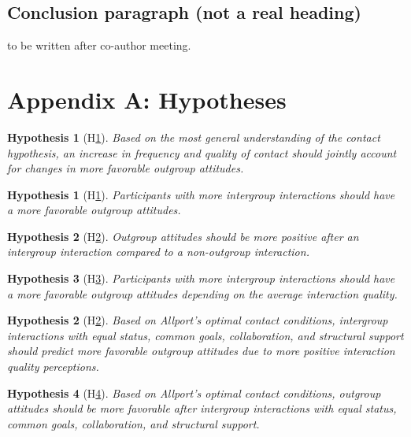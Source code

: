 \documentclass[man, 12pt, a4paper]{apa7}
\theoremstyle{break}
\theoremstyle{plain}
\newtheorem{hyp}{Hypothesis}
\newtheorem{subhyp}{Hypothesis}
\begin{document}
\subsection{Conclusion paragraph (not a real heading)}
to be written after co-author meeting.


\printbibliography

\appendix

\section{Appendix A: Hypotheses}
\label{app:AppendixHypotheses}

\begin{hyp}[H\ref{hyp:contact}] \label{hyp:contact}
Based on the most general understanding of the contact hypothesis, an increase in frequency and quality of contact should jointly account for changes in more favorable outgroup attitudes.
\end{hyp}

\begin{subhyp}[H\ref{hyp:contactFreq}] \label{hyp:contactFreq}
\addtolength{\leftskip}{2.5em}
Participants with more intergroup interactions should have a more favorable outgroup attitudes.
\end{subhyp}

\begin{subhyp}[H\ref{hyp:contactDummy}] \label{hyp:contactDummy}
\addtolength{\leftskip}{2.5em}
Outgroup attitudes should be more positive after an intergroup interaction compared to a non-outgroup interaction.
\end{subhyp}

\begin{subhyp}[H\ref{hyp:contactFreqQual}] \label{hyp:contactFreqQual}
\addtolength{\leftskip}{2.5em}
Participants with more intergroup interactions should have a more favorable outgroup attitudes depending on the average interaction quality.
\end{subhyp}

\begin{hyp}[H\ref{hyp:AllportsConditions}] \label{hyp:AllportsConditions}
Based on Allport's optimal contact conditions, intergroup interactions with equal status, common goals, collaboration, and structural support should predict more favorable outgroup attitudes due to more positive interaction quality perceptions.
\end{hyp}

\setcounter{subhyp}{0}
\begin{subhyp}[H\ref{hyp:AllportsPred}] \label{hyp:AllportsPred}
\addtolength{\leftskip}{2.5em}
Based on Allport's optimal contact conditions, outgroup attitudes should be more favorable after intergroup interactions with equal status, common goals, collaboration, and structural support.
\end{subhyp}
\end{document}
